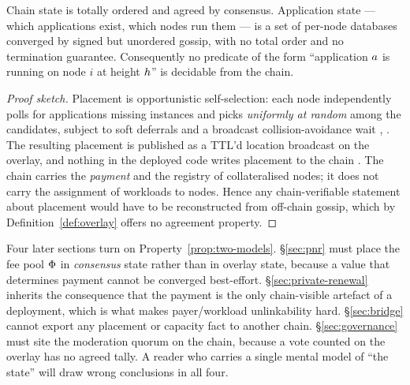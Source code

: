 \begin{property}
\label{prop:two-models}
\shipped Chain state is totally ordered and agreed by consensus. Application state --- which
applications exist, which nodes run them --- is a set of per-node databases converged by signed but
unordered gossip, with no total order and no termination guarantee. Consequently no
predicate of the form ``application $a$ is running on node $i$ at height $h$'' is decidable
from the chain.
\end{property}

\begin{proof}[Proof sketch]
Placement is opportunistic self-selection: each node independently polls for applications missing
instances and picks \emph{uniformly at random} among the candidates, subject to soft deferrals and a
broadcast collision-avoidance wait ,
. The resulting placement is published as a TTL'd
location broadcast on the overlay, and nothing in the deployed code writes placement to the chain
. The chain carries the \emph{payment} and the
registry of collateralised nodes; it does not carry the assignment of workloads to nodes. Hence any
chain-verifiable statement about placement would have to be reconstructed from off-chain gossip,
which by Definition~\ref{def:overlay} offers no agreement property.
\end{proof}

\begin{remark}
\label{rem:why-structural}
Four later sections turn on Property~\ref{prop:two-models}. \S\ref{sec:pnr} must place the fee pool
$\Phi$ in \emph{consensus} state rather than in overlay state, because a value that determines
payment cannot be converged best-effort. \S\ref{sec:private-renewal} inherits the consequence that
the payment is the only chain-visible artefact of a deployment, which is what makes payer/workload
unlinkability hard. \S\ref{sec:bridge} cannot export any placement or capacity fact to another chain.
\S\ref{sec:governance} must site the moderation quorum on the chain, because a vote counted on the
overlay has no agreed tally. A reader who carries a single mental model of ``the \Flux{} state''
will draw wrong conclusions in all four.
\end{remark}

